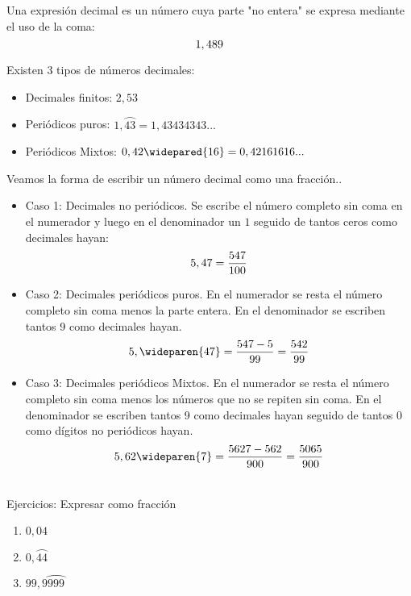Una expresión decimal es un número cuya parte "no entera" se expresa mediante el uso de la coma:\\
\begin{equation}
    \notag
    1,489
\end{equation}

Existen 3 tipos de números decimales:

\begin{itemize}
    \item Decimales finitos: $ 2,53$
    \item Periódicos puros:  $1,\wideparen{43}=1,43434343...$
    \item Periódicos Mixtos: $ 0,42\widepared{16}=0,42161616...$ 
    
\end{itemize}

Veamos la forma de escribir un número decimal como una fracción.. \\
\medskip

\begin{itemize}
    \item Caso 1: Decimales no periódicos. Se escribe el número completo sin coma en el numerador y luego en el denominador un $1$ seguido de tantos ceros como decimales hayan:
     \begin{equation}
    \notag
      5,47 = \frac{547}{100}
     \end{equation}
      
      
    \item Caso 2: Decimales periódicos puros. En el numerador se resta el número completo sin coma menos la parte entera. En el denominador se escriben tantos 9 como decimales hayan.
     \begin{equation}
    \notag
    5,\wideparen{47} = \frac{547-5}{99}=\frac{542}{99}
     \end{equation}
     
     
    \item Caso 3: Decimales periódicos Mixtos. En el numerador se resta el número completo sin coma menos los números que no se repiten sin coma. En el denominador se escriben tantos 9 como decimales hayan seguido de tantos 0 como dígitos no periódicos hayan.
    \begin{equation}
    \notag
    5,62\wideparen{7} = \frac{5627-562}{900} = \frac{5065}{900}
     \end{equation}
\end{itemize}\\

Ejercicios: Expresar como fracción\\

\begin{enumerate}
\renewcommand{\labelenumi}{{\theenumi})}
\item $0,04$
\item $0,\wideparen{44}$
\item $99,9\wideparen{999}$
\end{enumerate}